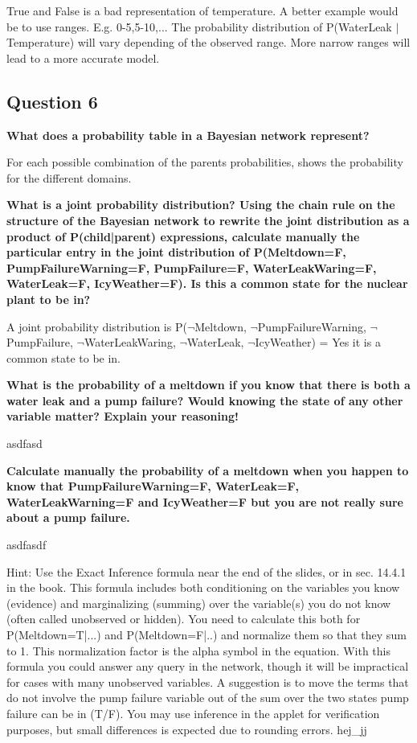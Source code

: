 \documentclass[12pt,a4paper]{article}
\begin{document}
True and False is a bad representation of temperature. A better example would be to use ranges. E.g. 0-5,5-10,... The probability distribution of P(WaterLeak $|$ Temperature) will vary depending of the observed range. More narrow ranges will lead to a more accurate model.

\subsection{Question 6}
\textbf{What does a probability table in a Bayesian network represent?}

For each possible combination of the parents probabilities, shows the probability for the different domains. 

\textbf{What is a joint probability distribution? Using the chain rule on the structure of the Bayesian network to rewrite the joint distribution as a product of P(child|parent) expressions, calculate manually the particular entry in the joint distribution of P(Meltdown=F, PumpFailureWarning=F, PumpFailure=F, WaterLeakWaring=F, WaterLeak=F, IcyWeather=F). Is this a common state for the nuclear plant to be in?}

A joint probability distribution is 
P($\lnot$Meltdown, $\lnot$PumpFailureWarning, $\lnot$PumpFailure, $\lnot$WaterLeakWaring, $\lnot$WaterLeak, $\lnot$IcyWeather) = 
Yes it is a common state to be in.

\textbf{What is the probability of a meltdown if you know that there is both a water leak and a pump failure? Would knowing the state of any other variable matter? Explain your reasoning!}

asdfasd

\textbf{Calculate manually the probability of a meltdown when you happen to know that PumpFailureWarning=F, WaterLeak=F, WaterLeakWarning=F and IcyWeather=F but you are not really sure about a pump failure.}

asdfasdf

    Hint: Use the Exact Inference formula near the end of the slides, or in sec. 14.4.1 in the book. This formula includes both conditioning on the variables you know (evidence) and marginalizing (summing) over the variable(s) you do not know (often called unobserved or hidden). You need to calculate this both for P(Meltdown=T|...) and P(Meltdown=F|..) and normalize them so that they sum to 1. This normalization factor is the alpha symbol in the equation. With this formula you could answer any query in the network, though it will be impractical for cases with many unobserved variables. A suggestion is to move the terms that do not involve the pump failure variable out of the sum over the two states pump failure can be in (T/F). You may use inference in the applet for verification purposes, but small differences is expected due to rounding errors. 
    hej\_jj
\end{document}
